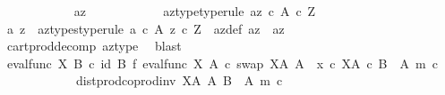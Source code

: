 \begin{isabellebody}
\ \ \ \ \ \ \ \ \ \ \isamarkupfalse%
\ az\isanewline
\ \ \ \ \ \ \ \ \ \ \isamarkupfalse%
\ az{\isacharunderscore}{\kern0pt}type{\isacharbrackleft}{\kern0pt}type{\isacharunderscore}{\kern0pt}rule{\isacharbrackright}{\kern0pt}{\isacharcolon}{\kern0pt}\ {\isachardoublequoteopen}az\ {\isasymin}\isactrlsub c\ A\ {\isasymtimes}\isactrlsub c\ Z{\isachardoublequoteclose}\isanewline
\isanewline
\ \ \ \ \ \ \ \ \ \ \isamarkupfalse%
\ a\ z\ \ az{\isacharunderscore}{\kern0pt}types{\isacharbrackleft}{\kern0pt}type{\isacharunderscore}{\kern0pt}rule{\isacharbrackright}{\kern0pt}{\isacharcolon}{\kern0pt}\ {\isachardoublequoteopen}a\ {\isasymin}\isactrlsub c\ A{\isachardoublequoteclose}\ {\isachardoublequoteopen}z\ {\isasymin}\isactrlsub c\ Z{\isachardoublequoteclose}\ \ az{\isacharunderscore}{\kern0pt}def{\isacharcolon}{\kern0pt}\ {\isachardoublequoteopen}az\ {\isacharequal}{\kern0pt}\ {\isasymlangle}a{\isacharcomma}{\kern0pt}z{\isasymrangle}{\isachardoublequoteclose}\isanewline
\ \ \ \ \ \ \ \ \ \ \ \ \isamarkupfalse%
\ cart{\isacharunderscore}{\kern0pt}prod{\isacharunderscore}{\kern0pt}decomp\ az{\isacharunderscore}{\kern0pt}type\ \isamarkupfalse%
\ blast\isanewline
\isanewline
\ \ \ \ \ \ \ \ \ \ \isamarkupfalse%
\ {\isachardoublequoteopen}{\isacharparenleft}{\kern0pt}eval{\isacharunderscore}{\kern0pt}func\ X\ B{\isacharparenright}{\kern0pt}\ {\isasymcirc}\isactrlsub c\ {\isacharparenleft}{\kern0pt}id\ B\ {\isasymtimes}\isactrlsub f\ {\isacharparenleft}{\kern0pt}{\isacharparenleft}{\kern0pt}{\isacharparenleft}{\kern0pt}eval{\isacharunderscore}{\kern0pt}func\ X\ A\ {\isasymcirc}\isactrlsub c\ swap\ {\isacharparenleft}{\kern0pt}X\isactrlbsup A\isactrlesup {\isacharparenright}{\kern0pt}\ A{\isacharparenright}{\kern0pt}\ {\isasymamalg}\ {\isacharparenleft}{\kern0pt}x\ {\isasymcirc}\isactrlsub c\ {\isasymbeta}\isactrlbsub X\isactrlbsup A\isactrlesup \ {\isasymtimes}\isactrlsub c\ {\isacharparenleft}{\kern0pt}B\ {\isasymsetminus}\ {\isacharparenleft}{\kern0pt}A{\isacharcomma}{\kern0pt}\ m{\isacharparenright}{\kern0pt}{\isacharparenright}{\kern0pt}\isactrlesub {\isacharparenright}{\kern0pt}\ {\isasymcirc}\isactrlsub c\isanewline
\ \ \ \ \ \ \ \ \ \ \ \ dist{\isacharunderscore}{\kern0pt}prod{\isacharunderscore}{\kern0pt}coprod{\isacharunderscore}{\kern0pt}inv\ {\isacharparenleft}{\kern0pt}X\isactrlbsup A\isactrlesup {\isacharparenright}{\kern0pt}\ A\ {\isacharparenleft}{\kern0pt}B\ {\isasymsetminus}\ {\isacharparenleft}{\kern0pt}A{\isacharcomma}{\kern0pt}\ m{\isacharparenright}{\kern0pt}{\isacharparenright}{\kern0pt}\ {\isasymcirc}\isactrlsub c\isanewline

\end{isabellebody}
